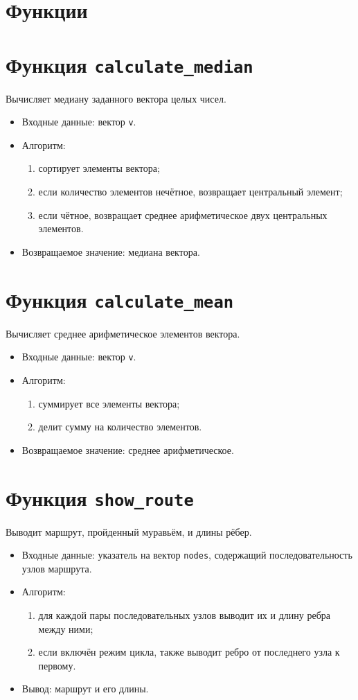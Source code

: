 \section{Функции}

\section*{Функция \texttt{calculate\_median}}
Вычисляет медиану заданного вектора целых чисел.
\begin{itemize}
	\item Входные данные: вектор \texttt{v}.
	\item Алгоритм:
	\begin{enumerate}
		\item сортирует элементы вектора;
		\item если количество элементов нечётное, возвращает центральный элемент;
		\item если чётное, возвращает среднее арифметическое двух центральных элементов.
	\end{enumerate}
	\item Возвращаемое значение: медиана вектора.
\end{itemize}

\section*{Функция \texttt{calculate\_mean}}
Вычисляет среднее арифметическое элементов вектора.
\begin{itemize}
	\item Входные данные: вектор \texttt{v}.
	\item Алгоритм:
	\begin{enumerate}
		\item суммирует все элементы вектора;
		\item делит сумму на количество элементов.
	\end{enumerate}
	\item Возвращаемое значение: среднее арифметическое.
\end{itemize}

\section*{Функция \texttt{show\_route}}
Выводит маршрут, пройденный муравьём, и длины рёбер.
\begin{itemize}
	\item Входные данные: указатель на вектор \texttt{nodes}, содержащий последовательность узлов маршрута.
	\item Алгоритм:
	\begin{enumerate}
		\item для каждой пары последовательных узлов выводит их и длину ребра между ними;
		\item если включён режим цикла, также выводит ребро от последнего узла к первому.
	\end{enumerate}
	\item Вывод: маршрут и его длины.
\end{itemize}

